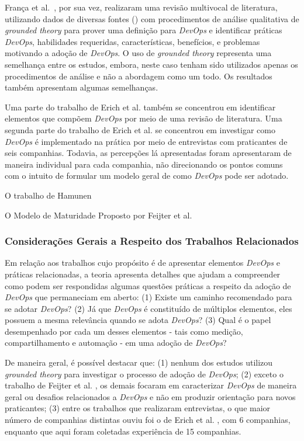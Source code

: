 Fran\c{c}a et al.~\cite{characterizing_devops}, por sua vez, realizaram uma
revisão multivocal de literatura, utilizando dados de diversas fontes () com
procedimentos de análise qualitativa de {\it grounded theory} para prover uma
definição para {\it DevOps} e identificar práticas {\it DevOps}, habilidades
requeridas, características, benefícios, e problemas motivando a adoção
de {\it DevOps}. O uso de {\it grounded theory} representa uma semelhança entre
os estudos, embora, neste caso tenham sido utilizados apenas os procedimentos
de análise e não a abordagem como um todo. Os resultados também apresentam
algumas semelhanças.

Uma parte do trabalho de Erich et al. \cite{qualitative_devops_journalsw_17} também
se concentrou em identificar elementos que compõem {\it DevOps} por meio de uma
revisão de literatura. Uma segunda parte do trabalho de Erich et al. \cite{qualitative_devops_journalsw_17}
se concentrou em investigar como {\it DevOps} é implementado na prática por
meio de entrevistas com praticantes de seis companhias. Todavia, as percepções
lá apresentadas foram apresentaram de maneira individual para cada companhia,
não direcionando os pontos comuns com o intuito de formular um modelo geral de
como {\it DevOps} pode ser adotado.

O trabalho de Hamunen \cite{challenges_in_adopting_devops}

O Modelo de Maturidade Proposto por Feijter et al. \cite{feijter2017towards}

\subsubsection{Considerações Gerais a Respeito dos Trabalhos Relacionados}

Em relação aos trabalhos cujo propósito é de apresentar elementos {\it DevOps} e
práticas relacionadas, a teoria apresenta detalhes que ajudam a
compreender como podem ser respondidas algumas questões práticas a
respeito da adoção de {\it DevOps} que permaneciam em aberto: (1) Existe um caminho
recomendado para se adotar \textit{DevOps}? (2) Já que \textit{DevOps} é
constituído de múltiplos elementos, eles possuem a mesma relevância quando se
adota \textit{DevOps}? (3) Qual é o papel desempenhado por cada um desses
elementos - tais como medição, compartilhamento e automação - em uma adoção de
\textit{DevOps}?

De maneira geral, é possível destacar que: (1) nenhum dos estudos utilizou
{\it grounded theory} para investigar o processo de adoção de {\it DevOps};
(2) exceto o trabalho de Feijter et al. \cite{feijter2017towards}, os demais
focaram em caracterizar {\it DevOps} de maneira geral ou desafios relacionados
a {\it DevOps} e não em produzir orientação para novos praticantes; (3) entre os
trabalhos que realizaram entrevistas, o que maior número de companhias distintas
ouviu foi o de Erich et al. \cite{qualitative_devops_journalsw_17}, com 6
companhias, enquanto que aqui foram coletadas experiência de 15 companhias.
